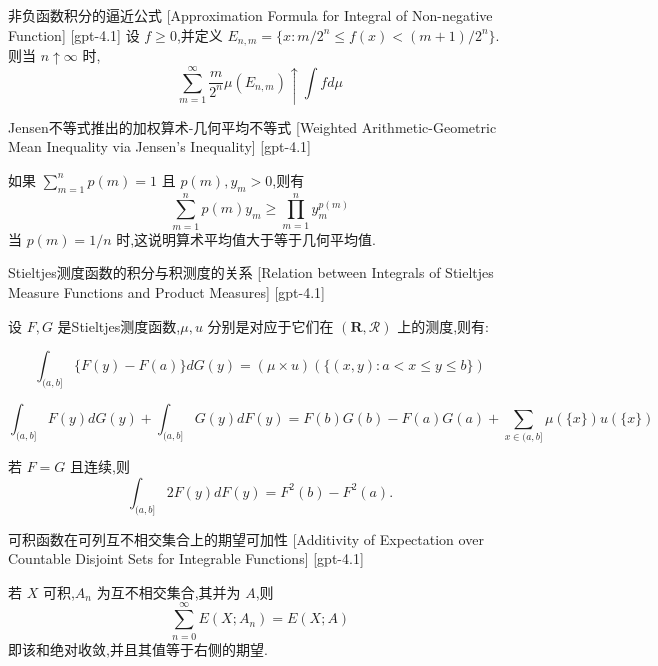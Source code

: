\documentclass[UTF8]{ctexart}
\begin{document}
    
    
    \begin{thm}
        {非负函数积分的逼近公式}
        [Approximation Formula for Integral of Non-negative Function]
        [gpt-4.1]
        设 $f \geq 0$,并定义 $E_{n, m} = \{ x : m / 2^{n} \leq f(x) < (m+1) / 2^{n} \}$.则当 $n \uparrow \infty$ 时,
\[
\sum_{m=1}^{\infty} \frac{m}{2^{n}} \mu(E_{n, m}) \uparrow \int f d \mu
\]
    \end{thm}
    
    
    
    \begin{thm}
        {Jensen不等式推出的加权算术-几何平均不等式}
        [Weighted Arithmetic-Geometric Mean Inequality via Jensen's Inequality]
        [gpt-4.1]
        
如果 $\sum_{m=1}^{n} p(m) = 1$ 且 $p(m), y_{m} > 0$,则有
\[
\sum_{m=1}^{n} p(m) y_{m} \geq \prod_{m=1}^{n} y_{m}^{p(m)}
\]
当 $p(m) = 1/n$ 时,这说明算术平均值大于等于几何平均值.

    \end{thm}
    
    
    
    \begin{thm}
        {Stieltjes测度函数的积分与积测度的关系}
        [Relation between Integrals of Stieltjes Measure Functions and Product Measures]
        [gpt-4.1]
        
设 $F, G$ 是Stieltjes测度函数,$\mu, 
u$ 分别是对应于它们在 $(\mathbf{R}, \mathcal{R})$ 上的测度,则有:

\[
\int_{(a, b]} \{ F(y) - F(a) \} dG(y) = (\mu \times 
u) (\{ (x, y) : a < x \leq y \leq b \})
\]

\[
\int_{(a, b]} F(y) dG(y) + \int_{(a, b]} G(y) dF(y)
= F(b) G(b) - F(a) G(a) + \sum_{x \in (a, b]} \mu(\{ x \}) 
u(\{ x \})
\]

若 $F = G$ 且连续,则
\[
\int_{(a, b]} 2 F(y) dF(y) = F^2(b) - F^2(a).
\]

    \end{thm}
    
    
    
    \begin{thm}
        {可积函数在可列互不相交集合上的期望可加性}
        [Additivity of Expectation over Countable Disjoint Sets for Integrable Functions]
        [gpt-4.1]
        
若 $X$ 可积,$A_{n}$ 为互不相交集合,其并为 $A$,则
\[
\sum_{n=0}^{\infty} E(X ; A_{n}) = E(X ; A)
\]
即该和绝对收敛,并且其值等于右侧的期望.

    \end{thm}
    
\end{document}
